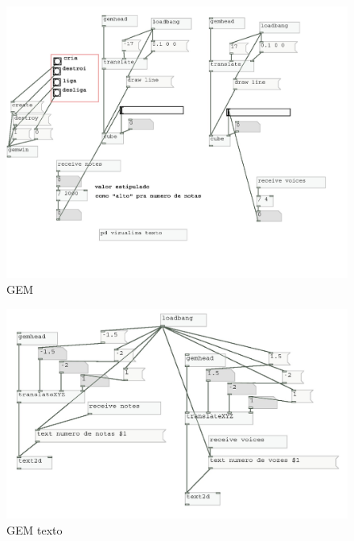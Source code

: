 \documentclass[draft]{ppgmus}
\begin{document}
\begin{figure}
\includegraphics[scale=.5]{gem00}
\caption{GEM}
\label{GEM}
\end{figure} 


\begin{figure}
\includegraphics[scale=.5]{gemtexto00}
\caption{GEM texto}
\label{GEM texto}
\end{figure} 
\end{document}
